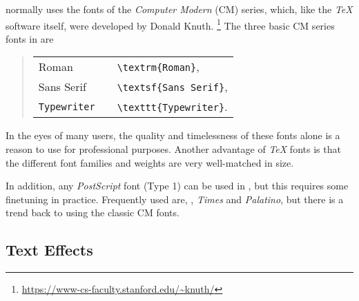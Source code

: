 \latex normally uses the fonts of the \emph{Computer Modern} (CM) series, which,
like the \emph{TeX} software itself, were developed by Donald Knuth.%
\footnote{\url{https://www-cs-faculty.stanford.edu/~knuth/}}
The three basic CM series fonts in \latex are
%
\begin{quote}
    \begin{tabular}{lcl}
        \textrm{Roman}      & & \verb!\textrm{Roman}!,      \\
        \textsf{Sans Serif} & & \verb!\textsf{Sans Serif}!, \\
        \texttt{Typewriter} & & \verb!\texttt{Typewriter}!.
    \end{tabular}
\end{quote}
%
In the eyes of many users, the quality and timelessness of these fonts alone is
a reason to use \latex for professional purposes. Another advantage of
\emph{TeX} fonts is that the different font families and weights are very
well-matched in size.

In addition, any \emph{PostScript} font (Type 1) can be used in \latex, but this
requires some finetuning in practice. Frequently used are, \eg, \emph{Times}
and \emph{Palatino}, but there is a trend back to using the classic CM fonts.

\subsection{Text Effects}

